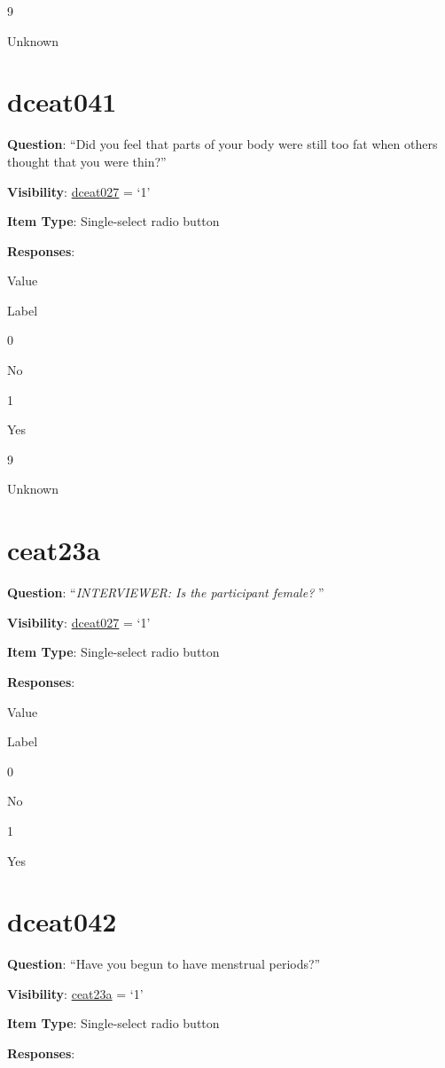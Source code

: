 \documentclass[]{book}
\begin{document}
9

Unknown

\hypertarget{dceat041}{%
\section{dceat041}\label{dceat041}}

\textbf{Question}: ``Did you feel that parts of your body were still too fat when others thought that you were thin?''

\textbf{Visibility}: \protect\hyperlink{dceat027}{dceat027} = `1'

\textbf{Item Type}: Single-select radio button

\textbf{Responses}:

Value

Label

0

No

1

Yes

9

Unknown

\hypertarget{ceat23a}{%
\section{ceat23a}\label{ceat23a}}

\textbf{Question}: ``\emph{INTERVIEWER: Is the participant female? }''

\textbf{Visibility}: \protect\hyperlink{dceat027}{dceat027} = `1'

\textbf{Item Type}: Single-select radio button

\textbf{Responses}:

Value

Label

0

No

1

Yes

\hypertarget{dceat042}{%
\section{dceat042}\label{dceat042}}

\textbf{Question}: ``Have you begun to have menstrual periods?''

\textbf{Visibility}: \protect\hyperlink{ceat23a}{ceat23a} = `1'

\textbf{Item Type}: Single-select radio button

\textbf{Responses}:
\end{document}
